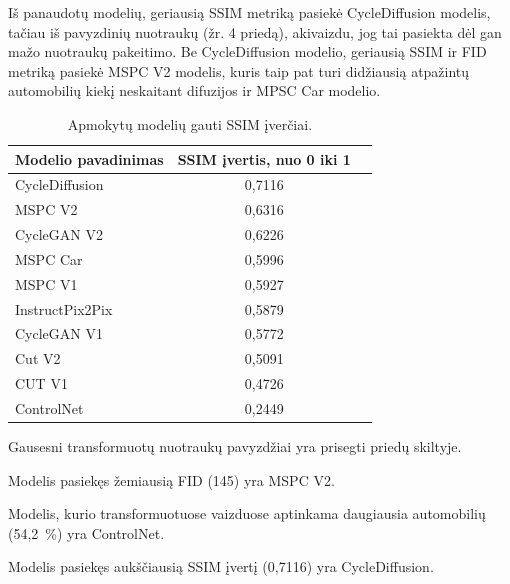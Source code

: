 \documentclass{VUMIFPSbakalaurinis}
\begin{document}
            Iš panaudotų modelių, geriausią SSIM metriką pasiekė CycleDiffusion modelis, tačiau iš pavyzdinių nuotraukų (žr. 4 priedą), akivaizdu, jog tai pasiekta dėl gan mažo nuotraukų pakeitimo. Be CycleDiffusion modelio, geriausią SSIM ir FID metriką pasiekė MSPC V2 modelis, kuris taip pat turi didžiausią atpažintų automobilių kiekį neskaitant difuzijos ir MPSC Car modelio.

        
            \begin{table}[H]
                \footnotesize
                \centering
                \caption{Apmokytų modelių gauti SSIM įverčiai.}
                {\begin{tabular}{|l|c|c|} \hline
                    Modelio pavadinimas & SSIM įvertis, nuo 0 iki 1\\
                    \hline
                    CycleDiffusion & 0,7116 \\ %
                    MSPC V2 & 0,6316 \\
                    CycleGAN V2 & 0,6226 \\
                    MSPC Car & 0,5996 \\ %
                    MSPC V1 & 0,5927 \\
                    InstructPix2Pix & 0,5879 \\ %
                    CycleGAN V1 & 0,5772 \\
                    Cut V2 & 0,5091\\ 
                    CUT V1 & 0,4726 \\
                    ControlNet & 0,2449 \\ %
                    \hline
                    \end{tabular}
                }
                \label{tab:table example}
            \end{table}
    
    Gausesni transformuotų nuotraukų pavyzdžiai yra prisegti priedų skiltyje.
    
    Modelis pasiekęs žemiausią FID (145) yra MSPC V2. 
    
    Modelis, kurio transformuotuose vaizduose aptinkama daugiausia automobilių (54,2~\%) yra ControlNet.
    
    Modelis pasiekęs aukščiausią SSIM įvertį (0,7116) yra CycleDiffusion.
    
\end{document}
